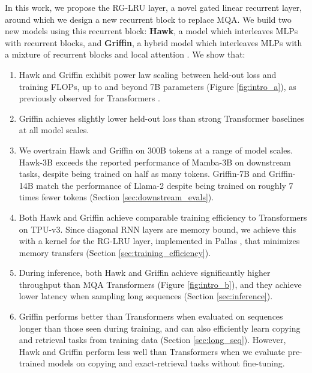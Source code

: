 \documentclass[11pt, a4paper, logo, onecolumn]{googledeepmind}
\theoremstyle{definition}
\begin{document}
In this work, we propose the RG-LRU layer, a novel gated linear recurrent layer, around which we design a new recurrent block to replace MQA. 
We build two new models using this recurrent block: \textbf{Hawk}, a model which interleaves MLPs with recurrent blocks, and \textbf{Griffin}, a hybrid model which interleaves MLPs with a mixture of recurrent blocks and local attention \citep{beltagy2020longformer}. We show that:

\begin{enumerate}
    \item Hawk and Griffin exhibit power law scaling between held-out loss and training FLOPs, up to and beyond 7B parameters (Figure \ref{fig:intro_a}), as previously observed for Transformers \citep{kaplan2020scaling}. \vspace{2mm}
    \item Griffin achieves slightly lower held-out loss than strong Transformer baselines at all model scales. \vspace{2mm}
    \item We overtrain Hawk and Griffin on 300B tokens at a range of model scales. Hawk-3B exceeds the reported performance of Mamba-3B \citep{gu2023mamba} on downstream tasks, despite being trained on half as many tokens. Griffin-7B and Griffin-14B match the performance of Llama-2 \citep{touvron2023llama} despite being trained on roughly 7 times fewer tokens (Section \ref{sec:downstream_evals}). \vspace{2mm}
    \item Both Hawk and Griffin achieve comparable training efficiency to Transformers on TPU-v3. Since diagonal RNN layers are memory bound, we achieve this with a kernel for the RG-LRU layer, implemented in Pallas \citep{jax2018github}, that minimizes memory transfers (Section \ref{sec:training_efficiency}). \vspace{2mm}
    \item During inference, both Hawk and Griffin achieve significantly higher throughput than MQA Transformers (Figure \ref{fig:intro_b}), and they achieve lower latency when sampling long sequences (Section \ref{sec:inference}). \vspace{2mm}
    \item Griffin performs better than Transformers when evaluated on sequences longer than those seen during training, and can also efficiently learn copying and retrieval tasks from training data (Section \ref{sec:long_seq}). However, Hawk and Griffin perform less well than Transformers when we evaluate pre-trained models on copying and exact-retrieval tasks without fine-tuning.
\end{enumerate}
\end{document}
